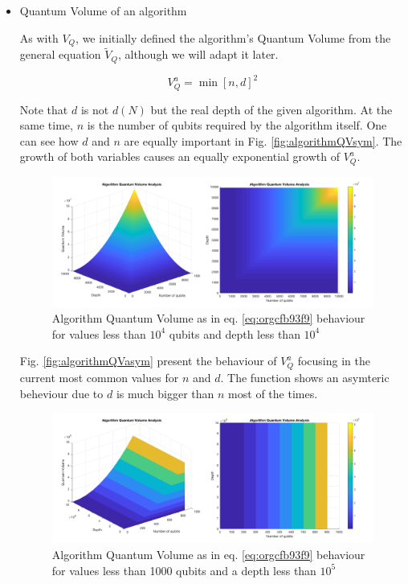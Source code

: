 \begin{itemize}
\begin{itemize}
\begin{itemize}
\item Quantum Volume of an algorithm
\label{sec:orga95674f}

As with \(V_Q\), we initially defined the algorithm's Quantum Volume from the general equation \(\tilde{V}_Q\), although we will adapt it later.

\begin{equation}
\label{eq:orgcfb93f9}
V_Q^a = \min \left[ n,d \right]^2
\end{equation}

Note that \(d\) is not \(d(N)\) but the real depth of the given algorithm.
At the same time, \(n\) is the number of qubits required by the algorithm itself.
One can see how \(d\) and \(n\) are equally important in Fig. \ref{fig:algorithmQVsym}.
The growth of both variables causes an equally exponential growth of \(V^a_Q\).

\begin{figure}[htbp]
\centering
\includegraphics[width=\textwidth]{figures/V_q_analysis_sym.png}
\caption{\label{fig:org5fcd262}
Algorithm Quantum Volume as in eq. \ref{eq:orgcfb93f9} behaviour for values less than \(10^{4}\) qubits and depth less than \(10^{4}\)}
\end{figure}

Fig. \ref{fig:algorithmQVasym} present the behaviour of \(V_Q^a\)
focusing in the current most common values for \(n\) and \(d\).
The function shows an asymteric beheviour due to \(d\) is much bigger than \(n\) most of the times.


\begin{figure}[htbp]
\centering
\includegraphics[width=\textwidth]{figures/V_q_analysis_asym.png}
\caption{\label{fig:org883aa7c}
Algorithm Quantum Volume as in eq. \ref{eq:orgcfb93f9} behaviour for values less than 1000 qubits and a depth less than \(10^{5}\)}
\end{figure}


\end{itemize}
\end{itemize}
\end{itemize}
